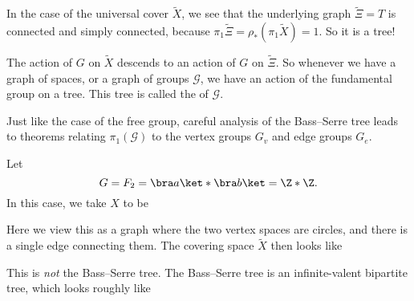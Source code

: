 \documentclass[a4paper]{article}
\begin{document}
In the case of the universal cover $\tilde{X}$, we see that the underlying graph $\tilde{\Xi} = T$ is connected and simply connected, because $\pi_1 \tilde{\Xi} = \rho_*(\pi_1 \tilde{X}) = 1$. So it is a tree!

The action of $G$ on $\tilde{X}$ descends to an action of $G$ on $\tilde{\Xi}$. So whenever we have a graph of spaces, or a graph of groups $\mathcal{G}$, we have an action of the fundamental group on a tree. This tree is called the  of $\mathcal{G}$.

Just like the case of the free group, careful analysis of the Bass--Serre tree leads to theorems relating $\pi_1(\mathcal{G})$ to the vertex groups $G_v$ and edge groups $G_e$.

\begin{eg}
  Let
  \[
    G = F_2 = \bra a\ket * \bra b\ket = \Z * \Z.
  \]
  In this case, we take $X$ to be

  \begin{center}
  \end{center}
  Here we view this as a graph where the two vertex spaces are circles, and there is a single edge connecting them. The covering space $\tilde{X}$ then looks like
  \begin{center}
  \end{center}
  This is \emph{not} the Bass--Serre tree. The Bass--Serre tree is an infinite-valent bipartite tree, which looks roughly like
  \begin{center}
    \begin{tikzpicture}


\end{tikzpicture}
\end{center}
\end{eg}
\end{document}
